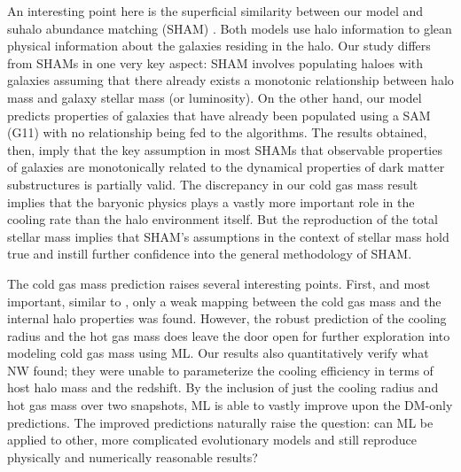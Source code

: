 \documentclass[a4paper,fleqn,usenatbib]{mnras}
\begin{document}
\par An interesting point here is the superficial similarity between our model and suhalo abundance matching (SHAM) \citep{conroy2009connecting}. Both models use halo information to glean physical information about the galaxies residing in the halo. Our study differs from SHAMs in one very key aspect: SHAM involves populating haloes with galaxies assuming that there already exists a monotonic relationship between halo mass and galaxy stellar mass (or luminosity). On the other hand, our model predicts properties of galaxies that have already been populated using a SAM (G11) with no relationship being fed to the algorithms. The results obtained, then, imply that the key assumption in most SHAMs that observable properties of galaxies are monotonically related to the dynamical properties of dark matter substructures is partially valid. The discrepancy in our cold gas mass result implies that the baryonic physics plays a vastly more important role in the cooling rate than the halo environment itself. But the reproduction of the total stellar mass implies that SHAM's assumptions in the context of stellar mass hold true and instill further confidence into the general methodology of SHAM. 

\par 
The cold gas mass prediction raises several interesting points. First, and most important, similar to \citet{contreras2015galaxy}, only a weak mapping between the cold gas mass and the internal halo properties was found. However, the robust prediction of the cooling radius and the hot gas mass does leave the door open for further exploration into modeling cold gas mass using ML. Our results also quantitatively verify what NW found; they were unable to parameterize the cooling efficiency in terms of host halo mass and the redshift. By the inclusion of just the cooling radius and hot gas mass over two snapshots, ML is able to vastly improve upon the DM-only predictions. The improved predictions naturally raise the question: can ML be applied to other, more complicated evolutionary models and still reproduce physically and numerically reasonable results? 
\end{document}

